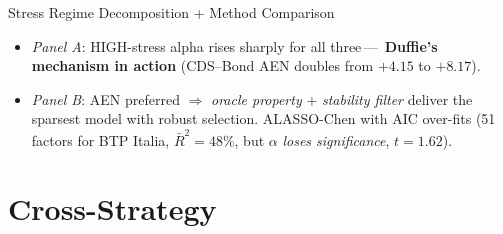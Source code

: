 \documentclass[aspectratio=169,11pt]{beamer}
\newcommand{\hlt}[1]{\textcolor{edhecred}{\textbf{#1}}}     %
\begin{document}
\begin{frame}[t]{Stress Regime Decomposition + Method Comparison}
\vspace{0.30cm}

\begin{itemize}\itemsep=0.05cm\footnotesize
  \item \emph{Panel A}: HIGH-stress alpha rises sharply for all three\,---\,
        \hlt{Duffie's mechanism in action} (CDS--Bond AEN doubles from $+4.15$ to $+8.17$).
  \item \emph{Panel B}: AEN preferred $\Rightarrow$ \emph{oracle property} + \emph{stability filter}
        deliver the sparsest model with robust selection. ALASSO-Chen with AIC over-fits
        (51 factors for BTP Italia, $\bar R^2 = 48\%$, but $\alpha$ \emph{loses significance}, $t=1.62$).
\end{itemize}

\end{frame}


\section{Cross-Strategy}
\end{document}

